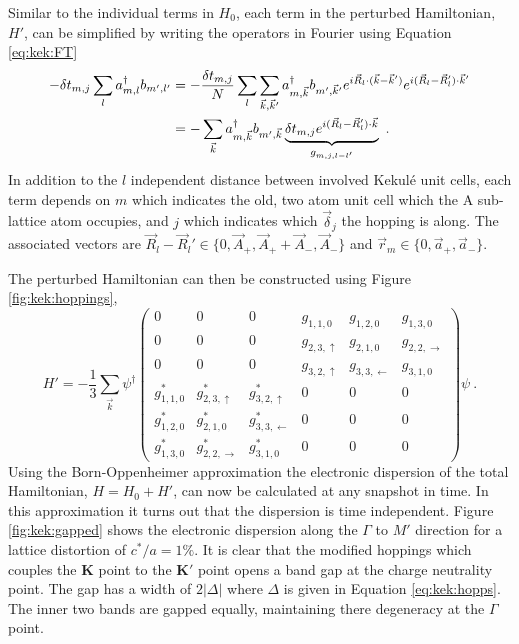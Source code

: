 Similar to the individual terms in $H_0$, each term in the perturbed Hamiltonian, $H'$, can be simplified by writing the operators in Fourier using Equation \ref{eq:kek:FT} 
\begin{align*}
	-  \delta t_{m,j} \sum_{l} a^{\dagger}_{m,l} b_{m',l'} &= 
	    -\frac{\delta t_{m,j}}{N}\sum_l \sum_{\vec{k},\vec{k}'} a^{\dagger}_{m,\vec{k}} b_{m',\vec{k}'} 
	    e^{i \vec{R}_l \cdot (\vec{k}-\vec{k}')} e^{i(\vec{R}_l-\vec{R}_l')\cdot \vec{k}'} \\
	    &=- \sum_{\vec{k}} a^{\dagger}_{m,\vec{k}} b_{m',\vec{k}} 
	    	\underbrace{ \delta t_{m,j}  e^{i(\vec{R}_l-\vec{R}_l')\cdot \vec{k}}}_{g_{m,j,l-l'}} \ .
\end{align*}
In addition to the $l$ independent distance between involved Kekul\'e unit cells, each term depends on $m$ which indicates the old, two atom unit cell which the A sub-lattice atom occupies, and $j$ which indicates which $\vec{\delta}_j$ the hopping is along.
The associated vectors are $\vec{R}_l-\vec{R}_l' \in \{ 0, \vec{A}_+, \vec{A}_+ +\vec{A}_-,\vec{A}_- \}$ and $\vec{r}_m \in \{ 0, \vec{a}_+,\vec{a}_- \}$.

The perturbed Hamiltonian can then be constructed using Figure \ref{fig:kek:hoppings}, 
\begin{equation*}
	H'=-\frac{1}{3} \sum_{\vec{k}} \psi^{\dagger} 
	\left(\begin{array}{cccccc}
		0           & 0                     & 0                    & g_{1,1,0}        & g_{1,2,0}          & g_{1,3,0} \\
		0           & 0                     & 0                    & g_{2,3,\uparrow} & g_{2,1,0}          & g_{2,2,\rightarrow} \\
		0           & 0                     & 0                    & g_{3,2,\uparrow} & g_{3,3,\leftarrow} & g_{3,1,0} \\
		g_{1,1,0}^* & g_{2,3,\uparrow}^*    & g_{3,2,\uparrow}^*   & 0            & 0              & 0 \\
		g_{1,2,0}^* & g_{2,1,0}^*           & g_{3,3,\leftarrow}^* & 0            & 0              & 0 \\
		g_{1,3,0}^* & g_{2,2,\rightarrow}^* & g_{3,1,0}^*          & 0            & 0              & 0 
	\end{array}\right)
	\psi \ .
\end{equation*}
Using the Born-Oppenheimer approximation the electronic dispersion of the total Hamiltonian, $H=H_0+H'$, can now be calculated at any snapshot in time.
In this approximation it turns out that the dispersion is time independent.
Figure \ref{fig:kek:gapped} shows the electronic dispersion along the $\Gamma$ to $M'$ direction for a lattice distortion of $c^*/a=1\%$.
It is clear that the modified hoppings which couples the $\bm{K}$ point to the $\bm{K'}$ point opens a band gap at the charge neutrality point.
The gap has a width of $2 |\Delta|$ where $\Delta$ is given in Equation \ref{eq:kek:hopps}.
The inner two bands are gapped equally, maintaining there degeneracy at the $\Gamma$ point.

